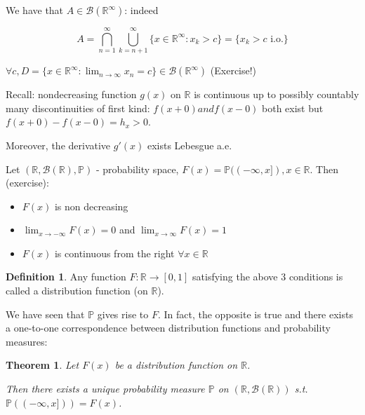 \documentclass{article}
\numberwithin{equation}{section}
\newtheorem{theorem}{Theorem}[section]
\theoremstyle{definition}
\newtheorem{definition}{Definition}[section]
\newcommand{\R}{\mathbb{R}}
\newcommand{\pr}{\mathbb{P}}
\newcommand{\mc}[1]{\mathcal{#1}}
\begin{document}
We have that $A \in \mc{B}(\R^\infty)$: indeed

\begin{equation}
    A = \bigcap_{n=1}^\infty \bigcup_{k=n+1}^\infty \{x \in \R^\infty: x_k > c\} = \{x_k > c \text{ i.o.}\}
\end{equation}

$\forall c, D = \{x \in \R^\infty: \lim_{n\rightarrow\infty}x_n = c\} \in \mc{B}(\R^\infty)$ (Exercise!)

Recall: nondecreasing function $g(x)$ on $\R$ is continuous up to possibly countably many discontinuities of first kind: $f(x+0) and f(x-0)$ both exist but $f(x+0) - f(x-0) = h_x > 0$.

Moreover, the derivative $g'(x)$ exists Lebesgue a.e.

Let $(\R, \mc{B}(\R), \pr)$ - probability space, $F(x) = \pr((-\infty,x]), x \in \R$. Then (exercise):

\begin{itemize}
    \item $F(x)$ is non decreasing
    \item $\lim_{x \rightarrow -\infty}F(x) = 0$ and $\lim_{x \rightarrow \infty}F(x) = 1$
    \item $F(x)$ is continuous from the right $\forall x \in \R$
\end{itemize}

\begin{definition}
    Any function $F:\R \rightarrow [0,1]$ satisfying the above 3 conditions is called a distribution function (on $\R$).
\end{definition}

We have seen that $\pr$ gives rise to $F$. In fact, the opposite is true and there exists a one-to-one correspondence between distribution functions and probability measures:

\begin{theorem}
    Let $F(x)$ be a distribution function on $\R$.

    Then there exists a unique probability measure $\pr$ on $(\R, \mc{B}(\R))$ s.t. $\pr((-\infty,x])) = F(x)$.
\end{theorem}
\end{document}
